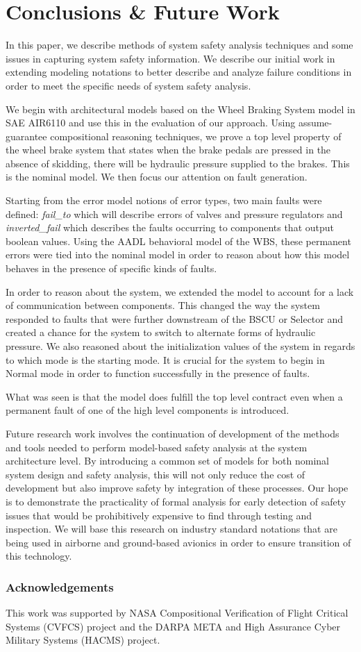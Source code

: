\section{Conclusions \& Future Work}
In this paper, we describe methods of system safety analysis techniques and some issues in capturing system safety information. We describe our initial work in extending modeling notations to better describe and analyze failure conditions in order to meet the specific needs of system safety analysis. 

We begin with architectural models based on the Wheel Braking System model in SAE AIR6110 and use this in the evaluation of our approach. Using assume-guarantee compositional reasoning techniques, we prove a top level property of the wheel brake system that states when the brake pedals are pressed in the absence of skidding, there will be hydraulic pressure supplied to the brakes. This is the nominal model. We then focus our attention on fault generation. 

Starting from the error model notions of error types, two main faults were defined: \textit{fail\_to} which will describe errors of valves and pressure regulators and \textit{inverted\_fail} which describes the faults occurring to components that output boolean values. Using the AADL behavioral model of the WBS, these permanent errors were tied into the nominal model in order to reason about how this model behaves in the presence of specific kinds of faults. 

In order to reason about the system, we extended the model to account for a lack of communication between components. This changed the way the system responded to faults that were further downstream of the BSCU or Selector and created a chance for the system to switch to alternate forms of hydraulic pressure. We also reasoned about the initialization values of the system in regards to which mode is the starting mode. It is crucial for the system to begin in Normal mode in order to function successfully in the presence of faults. 

What was seen is that the model does fulfill the top level contract even when a permanent fault of one of the high level components is introduced. 

Future research work involves the continuation of development of the methods and tools needed to perform model-based safety analysis at the system architecture level. By introducing a common set of models for both nominal system design and safety analysis, this will not only reduce the cost of development but also improve safety by integration of these processes. Our hope is to demonstrate the practicality of formal analysis for early detection of safety issues that would be prohibitively expensive to find through testing and inspection. We will base this research on industry standard notations that are being used in airborne and ground-based avionics in order to ensure transition of this technology. 

\subsubsection{Acknowledgements}
This work was supported by NASA Compositional Verification of Flight Critical Systems (CVFCS) project and the DARPA META and High Assurance Cyber Military Systems (HACMS) project. 




